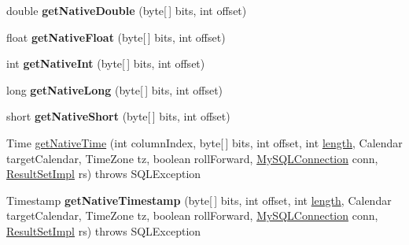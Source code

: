 \begin{DoxyCompactItemize}
\item 
\mbox{\label{classcom_1_1mysql_1_1jdbc_1_1_result_set_row_a73c7885d3165bd2c9c76e041d94bc11e}} 
double {\bfseries get\+Native\+Double} (byte\mbox{[}$\,$\mbox{]} bits, int offset)
\item 
\mbox{\label{classcom_1_1mysql_1_1jdbc_1_1_result_set_row_a4ece03d1a5f03aafb7634dc86cf82c2b}} 
float {\bfseries get\+Native\+Float} (byte\mbox{[}$\,$\mbox{]} bits, int offset)
\item 
\mbox{\label{classcom_1_1mysql_1_1jdbc_1_1_result_set_row_abf4363c1be1554e6bf1e05367f9d2b4b}} 
int {\bfseries get\+Native\+Int} (byte\mbox{[}$\,$\mbox{]} bits, int offset)
\item 
\mbox{\label{classcom_1_1mysql_1_1jdbc_1_1_result_set_row_a0ff7ffcc989d7e6032d5aff94384f2eb}} 
long {\bfseries get\+Native\+Long} (byte\mbox{[}$\,$\mbox{]} bits, int offset)
\item 
\mbox{\label{classcom_1_1mysql_1_1jdbc_1_1_result_set_row_ae548d76305fadd3ed630d42fa408fdd3}} 
short {\bfseries get\+Native\+Short} (byte\mbox{[}$\,$\mbox{]} bits, int offset)
\item 
Time \mbox{\hyperlink{classcom_1_1mysql_1_1jdbc_1_1_result_set_row_a658750cc3352c8d7d75b0884b5c28477}{get\+Native\+Time}} (int column\+Index, byte\mbox{[}$\,$\mbox{]} bits, int offset, int \mbox{\hyperlink{classcom_1_1mysql_1_1jdbc_1_1_result_set_row_a7d2e1a3d54533e0655afdc0a411808ed}{length}}, Calendar target\+Calendar, Time\+Zone tz, boolean roll\+Forward, \mbox{\hyperlink{interfacecom_1_1mysql_1_1jdbc_1_1_my_s_q_l_connection}{My\+S\+Q\+L\+Connection}} conn, \mbox{\hyperlink{classcom_1_1mysql_1_1jdbc_1_1_result_set_impl}{Result\+Set\+Impl}} rs)  throws S\+Q\+L\+Exception 
\item 
\mbox{\label{classcom_1_1mysql_1_1jdbc_1_1_result_set_row_ae3b80d6e8c2cc4c125a841fb1c55cc73}} 
Timestamp {\bfseries get\+Native\+Timestamp} (byte\mbox{[}$\,$\mbox{]} bits, int offset, int \mbox{\hyperlink{classcom_1_1mysql_1_1jdbc_1_1_result_set_row_a7d2e1a3d54533e0655afdc0a411808ed}{length}}, Calendar target\+Calendar, Time\+Zone tz, boolean roll\+Forward, \mbox{\hyperlink{interfacecom_1_1mysql_1_1jdbc_1_1_my_s_q_l_connection}{My\+S\+Q\+L\+Connection}} conn, \mbox{\hyperlink{classcom_1_1mysql_1_1jdbc_1_1_result_set_impl}{Result\+Set\+Impl}} rs)  throws S\+Q\+L\+Exception 

\end{DoxyCompactItemize}
